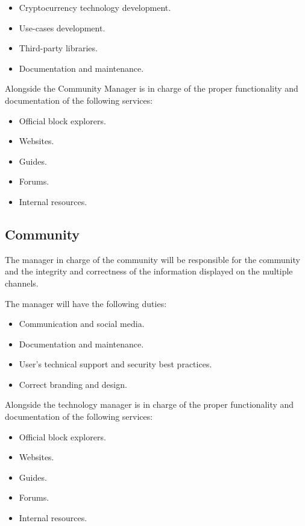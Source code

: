 \documentclass{article}
\begin{document}
\begin{itemize}
  \item Cryptocurrency technology development.
  \item Use-cases development.
  \item Third-party libraries.
  \item Documentation and maintenance.
\end{itemize}

Alongside the Community Manager is in charge of the proper functionality and documentation of the following services:

\begin{itemize}
  \item Official block explorers.
  \item Websites.
  \item Guides.
  \item Forums.
  \item Internal resources.
\end{itemize}

\subsection{Community}

The manager in charge of the community will be responsible for the community and the integrity and correctness of the information displayed on the multiple channels.

The manager will have the following duties:

\begin{itemize}
  \item Communication and social media.
  \item Documentation and maintenance.
  \item User's technical support and security best practices.
  \item Correct branding and design.
\end{itemize}

Alongside the technology manager is in charge of the proper functionality and documentation of the following services:

\begin{itemize}
  \item Official block explorers.
  \item Websites.
  \item Guides.
  \item Forums.
  \item Internal resources.
\end{itemize}
\end{document}
